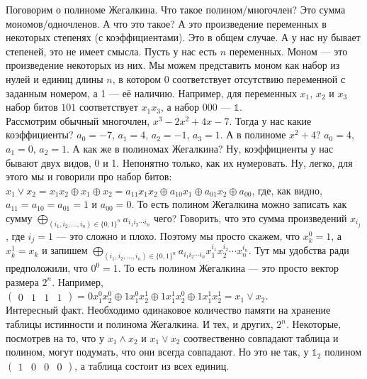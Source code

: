 \documentclass{article}
\begin{document}
\begin{itemize}
\begin{Comment}
        \end{Comment}
        \begin{Comment}
            Поговорим о полиноме Жегалкина. Что такое полином/многочлен? Это сумма мономов/одночленов. А что это такое? А это произведение переменных в некоторых степенях (с коэффициентами). Это в общем случае. А у нас ну бывает степеней, это не имеет смысла. Пусть у нас есть $n$ переменных. Моном --- это произведение некоторых из них. Мы можем представить моном как набор из нулей и единиц длины $n$, в котором 0 соответствует отсутствию переменной с заданным номером, а 1 --- её наличию. Например, для переменных $x_1$, $x_2$ и $x_3$ набор битов $101$ соответствует $x_1x_3$, а набор $000$ --- $\mathbb1$.\\
            Рассмотрим обычный многочлен, $x^3-2x^2+4x-7$. Тогда у нас какие коэффициенты? $a_0=-7$, $a_1=4$, $a_2=-1$, $a_3=1$. А в полиноме $x^2+4$? $a_0=4$, $a_1=0$, $a_2=1$. А как же в полиномах Жегалкина? Ну, коэффициенты у нас бывают двух видов, 0 и 1. Непонятно только, как их нумеровать. Ну, легко, для этого мы и говорили про набор битов: $x_1\lor x_2=x_1x_2\oplus x_1\oplus x_2=a_{11}x_1x_2\oplus a_{10}x_1\oplus a_{01}x_2\oplus a_{00}$, где, как видно, $a_{11}=a_{10}=a_{01}=1$ и $a_{00}=0$. То есть полином Жегалкина можно записать как сумму $\bigoplus\limits_{(i_1,i_2,\ldots,i_n)\in\{0,1\}^n}a_{i_1i_2\cdots i_n}$ чего? Говорить, что это сумма произведений $x_{i_j}$, где $i_j=1$ --- это сложно и плохо. Поэтому мы просто скажем, что $x_k^0=1$, а $x_k^1=x_k$ и запишем $\bigoplus\limits_{(i_1,i_2,\ldots,i_n)\in\{0,1\}^n}a_{i_1i_2\cdots i_n}x_1^{i_1}x_2^{i_2}\cdots x_n^{i_n}$. Тут мы удобства ради предположили, что $0^0=1$. То есть полином Жегалкина --- это просто вектор размера $2^n$.  Например, $\left(\begin{matrix}
                0 & 1 & 1 & 1
            \end{matrix}\right)=0x_1^0x_2^0\oplus 1x_1^0x_2^1\oplus 1x_1^1x_2^0\oplus 1x_1^1x_2^1=x_1\lor x_2$.\\
            Интересный факт. Необходимо одинаковое количество памяти на хранение таблицы истинности и полинома Жегалкина. И тех, и других, $2^n$. Некоторые, посмотрев на то, что у $x_1\land x_2$ и $x_1\lor x_2$ соотвественно совпадают таблица и полином, могут подумать, что они всегда совпадают. Но это не так, у $\mathbb1_2$ полином $\left(\begin{matrix}
                1 & 0 & 0 & 0
            \end{matrix}\right)$, а таблица состоит из всех единиц.\\

\end{Comment}
\end{itemize}
\end{document}
